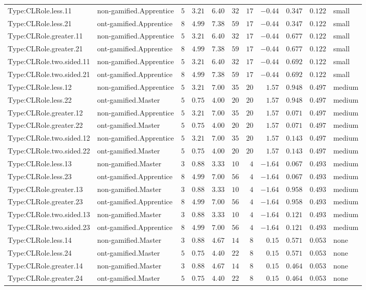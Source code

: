 \documentclass[6pt,a4paper]{article}
\begin{document}
{\begin{longtable}{llrrrrrrrrl}
Type:CLRole.less.11&non-gamified.Apprentice&$ 5$&$3.21$&$ 6.40$&$ 32$&$17$&$-0.44$&$0.347$&$0.122$&small\tabularnewline
Type:CLRole.less.21&ont-gamified.Apprentice&$ 8$&$4.99$&$ 7.38$&$ 59$&$17$&$-0.44$&$0.347$&$0.122$&small\tabularnewline
Type:CLRole.greater.11&non-gamified.Apprentice&$ 5$&$3.21$&$ 6.40$&$ 32$&$17$&$-0.44$&$0.677$&$0.122$&small\tabularnewline
Type:CLRole.greater.21&ont-gamified.Apprentice&$ 8$&$4.99$&$ 7.38$&$ 59$&$17$&$-0.44$&$0.677$&$0.122$&small\tabularnewline
Type:CLRole.two.sided.11&non-gamified.Apprentice&$ 5$&$3.21$&$ 6.40$&$ 32$&$17$&$-0.44$&$0.692$&$0.122$&small\tabularnewline
Type:CLRole.two.sided.21&ont-gamified.Apprentice&$ 8$&$4.99$&$ 7.38$&$ 59$&$17$&$-0.44$&$0.692$&$0.122$&small\tabularnewline
Type:CLRole.less.12&non-gamified.Apprentice&$ 5$&$3.21$&$ 7.00$&$ 35$&$20$&$ 1.57$&$0.948$&$0.497$&medium\tabularnewline
Type:CLRole.less.22&ont-gamified.Master&$ 5$&$0.75$&$ 4.00$&$ 20$&$20$&$ 1.57$&$0.948$&$0.497$&medium\tabularnewline
Type:CLRole.greater.12&non-gamified.Apprentice&$ 5$&$3.21$&$ 7.00$&$ 35$&$20$&$ 1.57$&$0.071$&$0.497$&medium\tabularnewline
Type:CLRole.greater.22&ont-gamified.Master&$ 5$&$0.75$&$ 4.00$&$ 20$&$20$&$ 1.57$&$0.071$&$0.497$&medium\tabularnewline
Type:CLRole.two.sided.12&non-gamified.Apprentice&$ 5$&$3.21$&$ 7.00$&$ 35$&$20$&$ 1.57$&$0.143$&$0.497$&medium\tabularnewline
Type:CLRole.two.sided.22&ont-gamified.Master&$ 5$&$0.75$&$ 4.00$&$ 20$&$20$&$ 1.57$&$0.143$&$0.497$&medium\tabularnewline
Type:CLRole.less.13&non-gamified.Master&$ 3$&$0.88$&$ 3.33$&$ 10$&$ 4$&$-1.64$&$0.067$&$0.493$&medium\tabularnewline
Type:CLRole.less.23&ont-gamified.Apprentice&$ 8$&$4.99$&$ 7.00$&$ 56$&$ 4$&$-1.64$&$0.067$&$0.493$&medium\tabularnewline
Type:CLRole.greater.13&non-gamified.Master&$ 3$&$0.88$&$ 3.33$&$ 10$&$ 4$&$-1.64$&$0.958$&$0.493$&medium\tabularnewline
Type:CLRole.greater.23&ont-gamified.Apprentice&$ 8$&$4.99$&$ 7.00$&$ 56$&$ 4$&$-1.64$&$0.958$&$0.493$&medium\tabularnewline
Type:CLRole.two.sided.13&non-gamified.Master&$ 3$&$0.88$&$ 3.33$&$ 10$&$ 4$&$-1.64$&$0.121$&$0.493$&medium\tabularnewline
Type:CLRole.two.sided.23&ont-gamified.Apprentice&$ 8$&$4.99$&$ 7.00$&$ 56$&$ 4$&$-1.64$&$0.121$&$0.493$&medium\tabularnewline
Type:CLRole.less.14&non-gamified.Master&$ 3$&$0.88$&$ 4.67$&$ 14$&$ 8$&$ 0.15$&$0.571$&$0.053$&none\tabularnewline
Type:CLRole.less.24&ont-gamified.Master&$ 5$&$0.75$&$ 4.40$&$ 22$&$ 8$&$ 0.15$&$0.571$&$0.053$&none\tabularnewline
Type:CLRole.greater.14&non-gamified.Master&$ 3$&$0.88$&$ 4.67$&$ 14$&$ 8$&$ 0.15$&$0.464$&$0.053$&none\tabularnewline
Type:CLRole.greater.24&ont-gamified.Master&$ 5$&$0.75$&$ 4.40$&$ 22$&$ 8$&$ 0.15$&$0.464$&$0.053$&none\tabularnewline

\end{longtable}}
\end{document}
